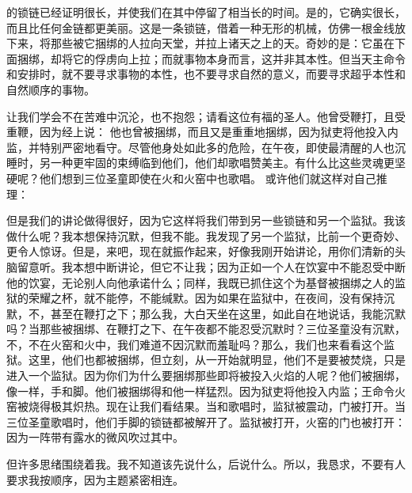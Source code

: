 的锁链已经证明很长，并使我们在其中停留了相当长的时间。是的，它确实很长，而且比任何金链都更美丽。这是一条锁链，借着一种无形的机械，仿佛一根金线放下来，将那些被它捆绑的人拉向天堂，并拉上诸天之上的天。奇妙的是：它虽在下面捆绑，却将它的俘虏向上拉；而就事物本身而言，这并非其本性。但当天主命令和安排时，就不要寻求事物的本性，也不要寻求自然的意义，而要寻求超乎本性和自然顺序的事物。\par

让我们学会不在苦难中沉沦，也不抱怨；请看这位有福的圣人。他曾受鞭打，且受重鞭，因为经上说： 他也曾被捆绑，而且又是重重地捆绑，因为狱吏将他投入内监，并特别严密地看守。尽管他身处如此多的危险，在午夜，即使最清醒的人也沉睡时，另一种更牢固的束缚临到他们，他们却歌唱赞美主。有什么比这些灵魂更坚硬呢？他们想到三位圣童即使在火和火窑中也歌唱。 或许他们就这样对自己推理：\par

但是我们的讲论做得很好，因为它这样将我们带到另一些锁链和另一个监狱。我该做什么呢？我本想保持沉默，但我不能。我发现了另一个监狱，比前一个更奇妙、更令人惊讶。但是，来吧，现在就振作起来，好像我刚开始讲论，用你们清新的头脑留意听。我本想中断讲论，但它不让我；因为正如一个人在饮宴中不能忍受中断他的饮宴，无论别人向他承诺什么；同样，我既已抓住这个为基督被捆绑之人的监狱的荣耀之杯，就不能停，不能缄默。因为如果在监狱中，在夜间，没有保持沉默，不，甚至在鞭打之下；那么我，大白天坐在这里，如此自在地说话，我能沉默吗？当那些被捆绑、在鞭打之下、在午夜都不能忍受沉默时？三位圣童没有沉默，不，不在火窑和火中，我们难道不因沉默而羞耻吗？那么，我们也来看看这个监狱。这里，他们也都被捆绑，但立刻，从一开始就明显，他们不是要被焚烧，只是进入一个监狱。因为你们为什么要捆绑那些即将被投入火焰的人呢？他们被捆绑，像一样，手和脚。他们被捆绑得和他一样猛烈。因为狱吏将他投入内监；王命令火窑被烧得极其炽热。现在让我们看结果。当和歌唱时，监狱被震动，门被打开。当三位圣童歌唱时，他们手脚的锁链都被解开了。监狱被打开，火窑的门也被打开：因为一阵带有露水的微风吹过其中。\par

但许多思绪围绕着我。我不知道该先说什么，后说什么。所以，我恳求，不要有人要求我按顺序，因为主题紧密相连。\par

